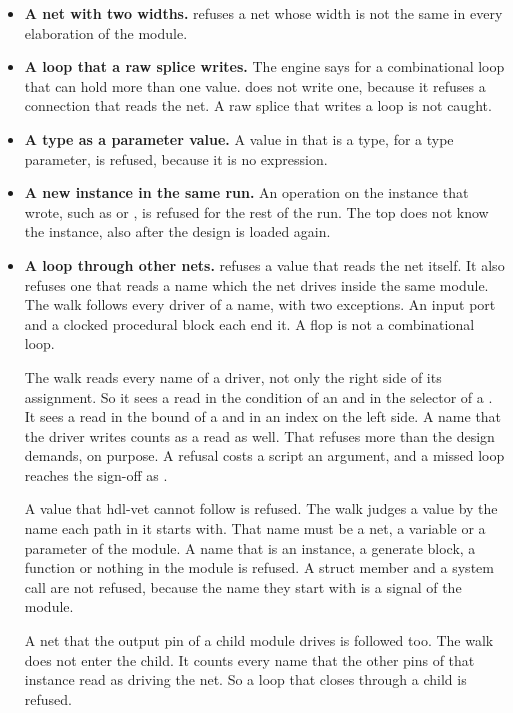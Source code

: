 \begin{itemize}
\item \textbf{A net with two widths.}  refuses a net
  whose width is not the same in every elaboration of the module.
\item \textbf{A loop that a raw splice writes.} The engine says  for a
  combinational loop that can hold more than one value.
   does not write one, because it refuses a connection
  that reads the net. A raw splice that writes a loop is not caught.
\item \textbf{A type as a parameter value.} A value in  that is a type, for
  a type parameter, is refused, because it is no expression.
\item \textbf{A new instance in the same run.} An operation on the instance that
   wrote, such as  or
  , is refused for the rest of the run. The top does not
  know the instance, also after the design is loaded again.
\item \textbf{A loop through other nets.}  refuses a value
  that reads the net itself. It also refuses one that reads a name which the net drives
  inside the same module. The walk follows every driver of a name, with two exceptions.
  An input port and a clocked procedural block each end it. A flop is not a combinational
  loop.

  The walk reads every name of a driver, not only the right side of its assignment. So it
  sees a read in the condition of an  and in the selector of a . It
  sees a read in the bound of a  and in an index on the left side. A name that
  the driver writes counts as a read as well. That refuses more than the design demands,
  on purpose. A refusal costs a script an argument, and a missed loop reaches the sign-off
  as .

  A value that hdl-vet cannot follow is refused. The walk judges a value by the name each
  path in it starts with. That name must be a net, a variable or a parameter of the
  module. A name that is an instance, a generate block, a function or nothing in the
  module is refused. A struct member and a system call are not refused, because the name
  they start with is a signal of the module.

  A net that the output pin of a child module drives is followed too. The walk does not
  enter the child. It counts every name that the other pins of that instance read as
  driving the net. So a loop that closes through a child is refused.


\end{itemize}
